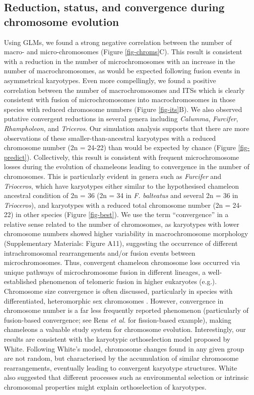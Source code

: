 \documentclass[a4paper, 12pt]{article}
\begin{document}
\subsection{Reduction, status, and convergence during chromosome evolution}
Using GLMs, we found a strong negative correlation between the number of macro- and micro-chromosomes (Figure \ref{fig-chroms}C). 
This result is consistent with a reduction in the number of microchromosomes with an increase in the number of macrochromosomes, as would be expected following fusion events in asymmetrical karyotypes. 
Even more compellingly, we found a positive correlation between the number of macrochromosomes and ITSs which is clearly consistent with fusion of microchromosomes into macrochromosomes in those species with reduced chromosome numbers (Figure \ref{fig-its}B). 
We also observed putative convergent reductions in several genera including \textit{Calumma}, \textit{Furcifer}, \textit{Rhampholeon}, and \textit{Triceros}. 
Our simulation analysis supports that there are more observations of these smaller-than-ancestral karyotypes with a reduced chromosome number (2n = 24-22) than would be expected by chance (Figure \ref{fig-predict}). 
Collectively, this result is consistent with frequent microchromosome losses during the evolution of chameleons leading to convergence in the number of chromosomes. 
This is particularly evident in genera such as \textit{Furcifer} and \textit{Trioceros}, which have karyotypes either similar to the hypothesised chameleon ancestral condition of 2n = 36 (2n = 34 in \textit{F. balteatus} and several 2n = 36 in \textit{Trioceros}), and karyotypes with a reduced total chromosome number (2n = 24-22) in other species (Figure \ref{fig-best}). 
We use the term ``convergence'' in a relative sense related to the number of chromosomes, as karyotypes with lower chromosome numbers showed higher variability in macrochromosome morphology (Supplementary Materials: Figure A11), suggesting the occurrence of different intrachromosomal rearrangements and/or fusion events between microchromosomes. 
Thus, convergent chameleon chromosome loss occurred via unique pathways of microchromosome fusion in different lineages, a well-established phenomenon of telomeric fusion in higher eukaryotes (e.g.\cite{heacock2004molecular}).  
Chromosome size convergence is often discussed, particularly in species with differentiated, heteromorphic sex chromosomes \cite{montiel2017discovery,kratochvil2021sex}. 
However, convergence in chromosome number is a far less frequently reported phenomenon (particularly of fusion-based convergence; see Rens \textit{et al.}\cite{rens2003reversal} for fission-based example), making chameleons a valuable study system for chromosome evolution. 
Interestingly, our results are consistent with the karyotypic orthoselection model proposed by White\cite{white1973,white1975chromosome}. 
Following White's model, chromosome changes found in any given group are not random, but characterised by the accumulation of similar chromosome rearrangements, eventually leading to convergent karyotype structures\cite{white1973,white1975chromosome}. 
White also suggested that different processes such as environmental selection or intrinsic chromosomal properties might explain orthoselection of karyotypes\cite{white1973,white1975chromosome}.
\end{document}
